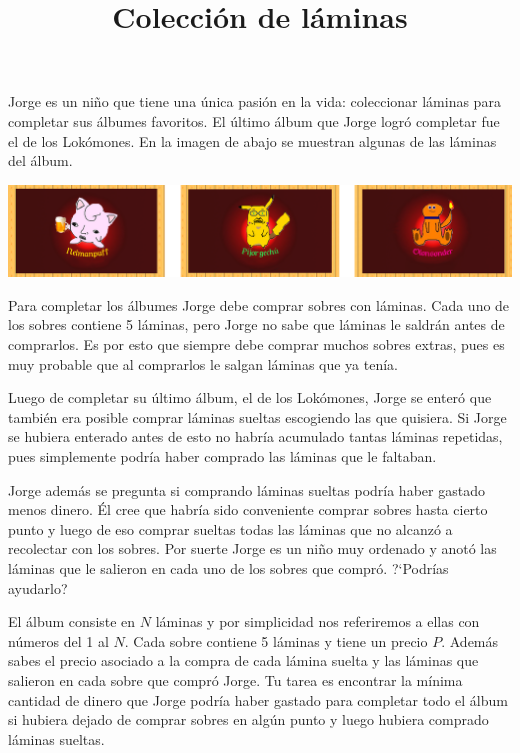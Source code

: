 \documentclass{oci}
\title{Colección de láminas}
\begin{document}
\begin{problemDescription}
Jorge es un niño que tiene una única pasión en la vida: coleccionar láminas para completar sus álbumes favoritos.
El último álbum que Jorge logró completar fue el de los Lokómones.
En la imagen de abajo se muestran algunas de las láminas del álbum.

\begin{center}
\includegraphics[scale=0.5]{locomons-laminas.png}
\end{center}

Para completar los álbumes Jorge debe comprar sobres con láminas.
Cada uno de los sobres contiene 5 láminas, pero Jorge no sabe que láminas le saldrán antes de comprarlos.
Es por esto que siempre debe comprar muchos sobres extras, pues es muy probable que al comprarlos le salgan láminas que ya tenía.

Luego de completar su último álbum, el de los Lokómones, Jorge se enteró que también era posible comprar láminas sueltas escogiendo las que quisiera.
Si Jorge se hubiera enterado antes de esto no habría acumulado tantas láminas repetidas, pues simplemente podría haber comprado las láminas que le faltaban.

Jorge además se pregunta si comprando láminas sueltas podría haber gastado menos dinero.
Él cree que habría sido conveniente comprar sobres hasta cierto punto y luego de eso comprar sueltas todas las láminas que no alcanzó a recolectar con los sobres.
Por suerte Jorge es un niño muy ordenado y anotó las láminas que le salieron en cada uno de los sobres que compró. ?`Podrías ayudarlo?

El álbum consiste en $N$ láminas y por simplicidad nos referiremos a ellas con números del 1 al $N$.
Cada sobre contiene 5 láminas y tiene un precio $P$.
Además sabes el precio asociado a la compra de cada lámina suelta y las láminas que salieron en cada sobre que compró Jorge.
Tu tarea es encontrar la mínima cantidad de dinero que Jorge podría haber gastado para completar todo el álbum si hubiera dejado de comprar sobres en algún punto y luego hubiera comprado láminas sueltas.
\end{problemDescription}
\end{document}
